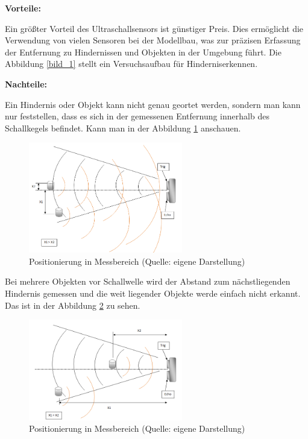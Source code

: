 \textbf{Vorteile:}  %

Ein größter Vorteil des Ultraschallsensors ist günstiger Preis. Dies ermöglicht die Verwendung von vielen Sensoren bei der Modellbau, was zur präzisen Erfassung der Entfernung zu Hindernissen und Objekten in der Umgebung führt. Die Abbildung \ref{bild_1} stellt ein Versuchsaufbau für Hinderniserkennen. 

\par\bigskip %
\textbf{Nachteile:}  %

Ein Hindernis oder Objekt kann nicht genau geortet werden, sondern man kann nur feststellen, dass es sich in der gemessenen Entfernung innerhalb des Schallkegels befindet. Kann man in der Abbildung \ref{bild_2} anschauen.

\begin{figure}[ht]  %
	\centering\includegraphics[width=0.6\textwidth]{images/Bild-2.png}
	\caption{Positionierung in Messbereich \newline (Quelle: eigene Darstellung)}
	\label{bild_2} %
\end{figure}

Bei mehrere Objekten vor Schallwelle wird der Abstand zum nächstliegenden Hindernis gemessen und die weit liegender Objekte werde einfach nicht erkannt. Das ist in der Abbildung \ref{bild_3} zu sehen.

\begin{figure}[ht]  %
	\centering\includegraphics[width=0.6\textwidth]{images/Bild-3.png}
	\caption{Positionierung in Messbereich \newline (Quelle: eigene Darstellung)}
	\label{bild_3} %
\end{figure}

